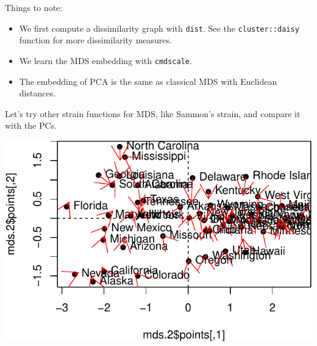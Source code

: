 \documentclass[]{book}
\newenvironment{Shaded}{\begin{snugshade}}{\end{snugshade}}
\newcommand{\CommentTok}[1]{\textcolor[rgb]{0.56,0.35,0.01}{\textit{#1}}}
\newcommand{\DataTypeTok}[1]{\textcolor[rgb]{0.13,0.29,0.53}{#1}}
\newcommand{\DecValTok}[1]{\textcolor[rgb]{0.00,0.00,0.81}{#1}}
\newcommand{\FloatTok}[1]{\textcolor[rgb]{0.00,0.00,0.81}{#1}}
\newcommand{\KeywordTok}[1]{\textcolor[rgb]{0.13,0.29,0.53}{\textbf{#1}}}
\newcommand{\NormalTok}[1]{#1}
\newcommand{\OperatorTok}[1]{\textcolor[rgb]{0.81,0.36,0.00}{\textbf{#1}}}
\newcommand{\OtherTok}[1]{\textcolor[rgb]{0.56,0.35,0.01}{#1}}
\newcommand{\StringTok}[1]{\textcolor[rgb]{0.31,0.60,0.02}{#1}}
\providecommand{\tightlist}{%
  \setlength{\itemsep}{0pt}\setlength{\parskip}{0pt}}
\theoremstyle{definition}
\theoremstyle{definition}
\theoremstyle{definition}
\theoremstyle{remark}
\begin{document}
Things to note:

\begin{itemize}
\tightlist
\item
  We first compute a dissimilarity graph with \texttt{dist}. See the \texttt{cluster::daisy} function for more dissimilarity measures.
\item
  We learn the MDS embedding with \texttt{cmdscale}.
\item
  The embedding of PCA is the same as classical MDS with Euclidean distances.
\end{itemize}

Let's try other strain functions for MDS, like Sammon's strain, and compare it with the PCs.

\begin{Shaded}
\end{Shaded}

\includegraphics[width=0.5\linewidth]{Rcourse_files/figure-latex/SammonMDS-1}
\end{document}
